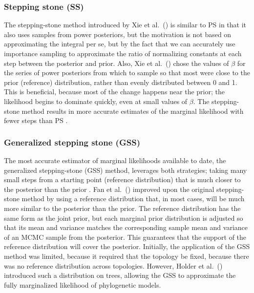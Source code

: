 \subsubsection{Stepping stone (SS)}
The stepping-stone method introduced by Xie et al.\ (\citeyear{Xie2011})
is similar to PS in that it also uses samples from power posteriors, but the
motivation is not based on approximating the integral per se, but by
the fact that we can accurately use importance sampling to approximate the
ratio of normalizing constants at each step between the posterior and prior.
Also, Xie et al.\ (\citeyear{Xie2011}) chose the values of $\beta$ for the
series of power posteriors from which to sample so that most were close to
the prior (reference) distribution, rather than evenly distributed between
0 and 1.
This is beneficial, because most of the change happens near the prior; the
likelihood begins to dominate quickly, even at small values of $\beta$.
The stepping-stone method results in more accurate estimates of the marginal
likelihood with fewer steps than PS \citep{Xie2011}.

\subsubsection{Generalized stepping stone (GSS)}
The most accurate estimator of marginal likelihoods available to date, the
generalized stepping-stone (GSS) method, leverages both strategies; taking many
small steps from a starting point (reference distribution) that is much closer
to the posterior than the prior \citep{Fan2011}.
Fan et al.\ (\citeyear{Fan2011}) improved upon the original stepping-stone
method by using a reference distribution that, in most cases, will be much more
similar to the posterior than the prior.
The reference distribution has the same form as the joint prior, but each
marginal prior distribution is adjusted so that its mean and variance matches
the corresponding sample mean and variance of an MCMC sample from the
posterior.
This guarantees that the support of the reference distribution will cover the
posterior.
Initially, the application of the GSS method was limited, because it required
that the topology be fixed, because there was no reference distribution across
topologies.
However, Holder et al.\ (\citeyear{Holder2014}) introduced such a distribution
on trees, allowing the GSS to approximate the fully marginalized likelihood of
phylogenetic models.

